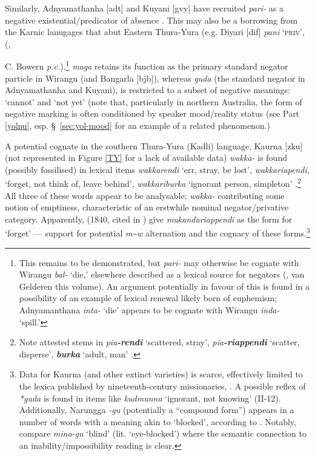  Similarly, Adnyamathanha [\gls{adt}] and Kuyani [\gls{gvy}] have recruited \textit{pari-} as a negative existential/predicator of absence \citep[141]{Hercus1999}. This may also be a borrowing from the Karnic lanugages that abut Eastern Thura-Yura (e.g. Diyari [\gls{dif}] \textit{pani} \textsc{`priv'}, (\citealt{Austin2011}, {C. Bowern \textit{p.c.}).\footnote{This remains to be demonstrated, but \textit{pari-} may otherwise be cognate with Wirangu \textit{bal-} `die,' elsewhere described as a lexical source for negators (\citealt{Veselinova2013}, van Gelderen this volume). An argument potentially in favour of this is found in a possibility of an example of lexical renewal likely born of euphemism; Adnyamanthana \textit{inta-} `die' appears to be cognate with Wirangu \textit{inda-} `spill.'}
\textit{maga} retains its function as the primary standard negator particle in Wirangu (and Bangarla [\gls{bjb}]),  whereas \textit{guda} (the standard negator in Adnyamathanha and Kuyani), is restricted to a subset of negative meanings: `cannot' and `not yet' (note that, particularly in northern Australia, the form of negative marking is often conditioned by speaker mood/reality status (see Part \ref{yolŋu}, esp. \S~\ref{sec:yol-mood} for an example of a related phenomenon.)

A potential cognate in the southern Thura-Yura (Kadli) language, Kaurna [\gls{zku}] (not represented in Figure \ref{TY} for a lack of available data) \textit{wakka-} is found (possibly fossilised) in lexical items \textit{wakkarendi} `err, stray, be lost', \textit{wakkariapendi}, `forget, not think of, leave behind', \textit{wakkariburka} `ignorant person, simpleton' \citep[II-52]{Schurmann1840}.\footnote{Note attested stems in \textit{pia\textbf{-rendi}} `scattered, stray', \textit{pia\textbf{-riappendi}} `scatter, disperse', \textit{\textbf{burka}} `adult, man' \citep[II-4,38]{Schurmann1840}.} All three of these words appear to be analysable; \textit{wakka-} contributing some notion of emptiness, characteristic of an erstwhile nominal negator/privative category. Apparently, \citeauthor{Teichelmann1840} (1840, cited in \citealt{Amery1996a}) give \textit{mukandariappendi} as the form for `forget' --- support for potential \textit{m\textasciitilde{w}} alternation and the cognacy of these forms.\footnote{Data for Kaurna (and other extinct varieties) is scarce, effectively limited to the lexica published by nineteenth-century missionaries, \citet{Schurmann1840}. A possible reflex of \textit{*guda} is found in items like \textit{kudmunna} `ignorant, not knowing' (II-12). Additionally, Narungga \textit{-gu} (potentially a ``compound form'') appears in a number of words with a meaning akin to `blocked', according to \citet[82]{Eira2010}. Notably, compare \textit{mina-gu} `blind' (lit. `eye-blocked') where the semantic connection to an inability/impossibility reading is clear.
	
}}
